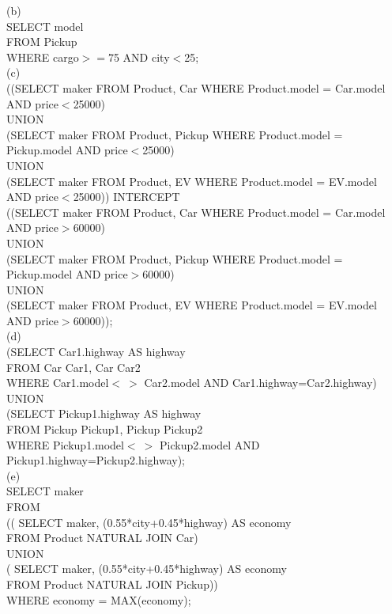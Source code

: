 \documentclass[11pt, oneside]{article}   	%
\begin{document}
(b)\\
SELECT model\\
FROM Pickup\\
WHERE cargo$>=$75 AND city$<$25;\\

(c)\\
((SELECT maker FROM Product, Car WHERE Product.model = Car.model AND price$<$25000)\\
UNION\\
(SELECT maker FROM Product, Pickup WHERE Product.model = Pickup.model AND price$<$25000)\\
UNION\\
(SELECT maker FROM Product, EV WHERE Product.model = EV.model AND price$<$25000))
INTERCEPT\\
((SELECT maker FROM Product, Car WHERE Product.model = Car.model AND price$>$60000)\\
UNION\\
(SELECT maker FROM Product, Pickup WHERE Product.model = Pickup.model AND price$>$60000)\\
UNION\\
(SELECT maker FROM Product, EV WHERE Product.model = EV.model AND price$>$60000));\\

(d)\\
(SELECT Car1.highway AS highway\\
FROM Car Car1, Car Car2\\
WHERE Car1.model$< \ > $ Car2.model AND Car1.highway=Car2.highway)\\
UNION\\
(SELECT Pickup1.highway AS highway\\
FROM Pickup Pickup1, Pickup Pickup2\\
WHERE Pickup1.model$< \ > $ Pickup2.model AND Pickup1.highway=Pickup2.highway);\\

(e)\\
SELECT maker\\
FROM\\
\hspace*{1cm} (( SELECT maker, (0.55*city+0.45*highway) AS economy\\
\hspace*{1cm} FROM Product NATURAL JOIN Car)\\
\hspace*{1cm} UNION\\
\hspace*{1cm}( SELECT maker, (0.55*city+0.45*highway) AS economy\\
\hspace*{1cm} FROM Product NATURAL JOIN Pickup))\\
WHERE economy = MAX(economy);\\
\end{document}
